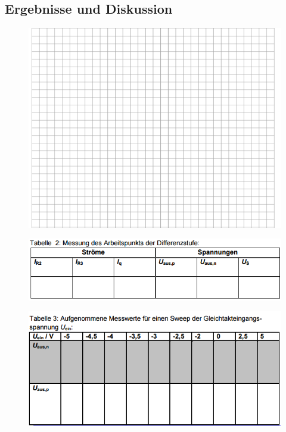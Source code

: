 \subsection{Ergebnisse und Diskussion}
\begin{figure}[!h]
\begin{center}
\includegraphics[scale=0.8]{Text}
\end{center}
\end{figure}
\begin{figure}[!ht]
\begin{center}
\includegraphics[scale=0.8]{Tabelle2}
\end{center}
\end{figure}
\begin{figure}[!ht]
\begin{center}
\includegraphics[scale=0.8]{Tabelle3}
\end{center}
\end{figure}
